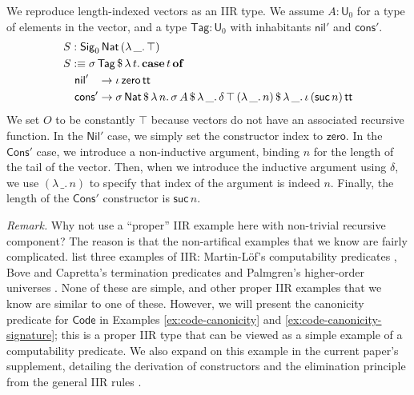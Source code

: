 \documentclass[acmsmall,screen,review]{acmart}
\newcommand{\msf}[1]{{\mathsf{#1}}}
\newcommand{\mbf}[1]{{\mathbf{#1}}}
\newcommand{\U}{\msf{U}}
\newcommand{\Nat}{\msf{Nat}}
\newcommand{\zero}{\msf{zero}}
\newcommand{\suc}{\msf{suc}}
\newcommand{\Nil}{\msf{Nil}}
\newcommand{\Cons}{\msf{Cons}}
\newcommand{\Sig}{\msf{Sig}}
\newcommand{\Code}{\msf{Code}}
\newcommand{\Tag}{\msf{Tag}}
\newcommand{\case}{\mbf{case}}
\newcommand{\of}{\mbf{of}}
\newcommand{\ttt}{\msf{tt}}
\newcommand{\nil}{\msf{nil}}
\newcommand{\cons}{\msf{cons}}
\begin{document}
\begin{example}\label{ex:vector} We reproduce length-indexed vectors as an IIR type. We assume $A : \U_0$ for a type of elements in the vector,
and a type $\Tag : \U_0$ with inhabitants $\nil'$ and $\cons'$.
\begin{alignat*}{4}
  & S : \Sig_0\,\Nat\,(\lambda\,\_.\,\top)\\
  & S :\equiv \sigma\,\Tag\,\$\,\lambda\,t.\,\case\,t\,\of \\
  & \quad \nil'\hspace{0.85em} \to \iota\,\zero\,\ttt \\
  & \quad \cons'\to \sigma\,\Nat\,\$\,\lambda\,n.\,\sigma\,A\,\$\,\lambda\,\_.\,\delta\,\top\,(\lambda\,\_.\,n)\,\$\,\lambda\,\_.\,\iota\,(\suc\,n)\,\ttt
\end{alignat*}
We set $O$ to be constantly $\top$ because vectors do not have an associated recursive function. In
the $\Nil'$ case, we simply set the constructor index to $\zero$. In the $\Cons'$ case, we introduce
a non-inductive argument, binding $n$ for the length of the tail of the vector. Then, when we
introduce the inductive argument using $\delta$, we use $(\lambda\,\_.\,n)$ to specify that index of
the argument is indeed $n$. Finally, the length of the $\Cons'$ constructor is $\suc\,n$.

\emph{Remark.} Why not use a ``proper'' IIR example here with non-trivial recursive component? The
reason is that the non-artifical examples that we know are fairly
complicated. \citet{DBLP:journals/jlp/DybjerS06} list three examples of IIR: Martin-Löf's
computability predicates \cite{martinlof84sambin}, Bove and Capretta's termination predicates
\cite{DBLP:conf/tphol/BoveC01} and Palmgren's higher-order universes
\cite{Palmgren98onuniverses}. None of these are simple, and other proper IIR examples that we know
are similar to one of these. However, we will present the canonicity predicate for $\Code$ in
Examples \ref{ex:code-canonicity} and \ref{ex:code-canonicity-signature}; this is a proper IIR type
that can be viewed as a simple example of a computability predicate. We also expand on this example
in the current paper's supplement, detailing the derivation of constructors and the elimination principle
from the general IIR rules \cite{ir-canonicity-supplement}.

\end{example}
\end{document}
